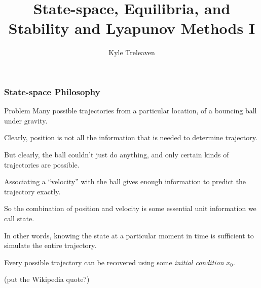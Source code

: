 \documentclass[12pt]{beamer}
\author{Kyle Treleaven}
\title{State-space, Equilibria, and Stability and Lyapunov Methods I}
\begin{document}
\begin{frame}
\titlepage

\end{frame}



\begin{frame}
\frametitle{State-space Philosophy}

\begin{block}{Problem}
Many possible trajectories from a particular location, of a bouncing ball under gravity.
\end{block}


\end{frame}


\begin{frame}

\begin{itemize}

\vitem Clearly, position is not all the information that is needed to determine trajectory.

\vitem But clearly, the ball couldn't just do anything, and only certain kinds of trajectories are possible.

\end{itemize}

\end{frame}



\begin{frame}
\begin{itemize}
\vitem Associating a ``velocity'' with the ball gives enough information to predict the trajectory exactly.

\vitem So the combination of position and velocity is some essential unit information we call state.

\vitem In other words, knowing the state at a particular moment in time is sufficient to simulate the entire trajectory.

\vitem Every possible trajectory can be recovered using some \emph{initial condition} $x_0$.
\end{itemize}

(put the Wikipedia quote?)

\vfill\null

\end{frame}
\end{document}
